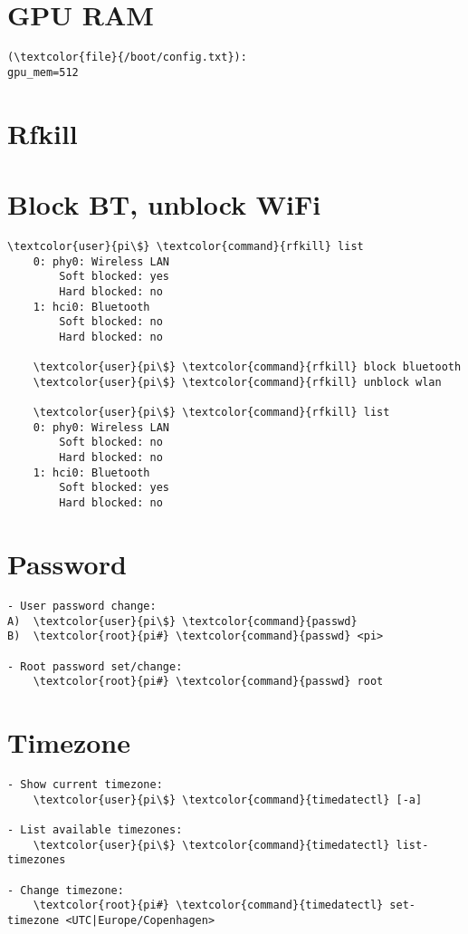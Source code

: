 \documentclass[10pt, a4paper, onecolumn, openany]{book} %
\begin{document}
\section{GPU RAM}
\begin{Verbatim}[commandchars=\\\{\}]
(\textcolor{file}{/boot/config.txt}):
gpu_mem=512
\end{Verbatim}
\section{Rfkill}
\section{Block BT, unblock WiFi}
\begin{Verbatim}[commandchars=\\\{\}]
    \textcolor{user}{pi\$} \textcolor{command}{rfkill} list
    0: phy0: Wireless LAN
        Soft blocked: yes
        Hard blocked: no
    1: hci0: Bluetooth
        Soft blocked: no
        Hard blocked: no
    
    \textcolor{user}{pi\$} \textcolor{command}{rfkill} block bluetooth
    \textcolor{user}{pi\$} \textcolor{command}{rfkill} unblock wlan

    \textcolor{user}{pi\$} \textcolor{command}{rfkill} list
    0: phy0: Wireless LAN
        Soft blocked: no
        Hard blocked: no
    1: hci0: Bluetooth
        Soft blocked: yes
        Hard blocked: no
\end{Verbatim}

\section{Password}
\begin{Verbatim}[commandchars=\\\{\}]
- User password change:
A)  \textcolor{user}{pi\$} \textcolor{command}{passwd}
B)  \textcolor{root}{pi#} \textcolor{command}{passwd} <pi>
   
- Root password set/change: 
    \textcolor{root}{pi#} \textcolor{command}{passwd} root
\end{Verbatim}

\section{Timezone}
\begin{Verbatim}[commandchars=\\\{\}]
- Show current timezone:
    \textcolor{user}{pi\$} \textcolor{command}{timedatectl} [-a]

- List available timezones:
    \textcolor{user}{pi\$} \textcolor{command}{timedatectl} list-timezones
    
- Change timezone:
    \textcolor{root}{pi#} \textcolor{command}{timedatectl} set-timezone <UTC|Europe/Copenhagen>
\end{Verbatim}
\end{document}
